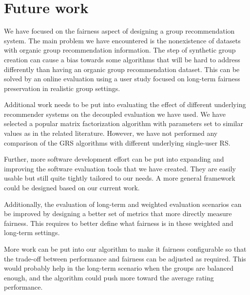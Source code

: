 \section{Future work}  \label{sec:08_conclusion.future_work}

We have focused on the fairness aspect of designing a group recommendation system. The main problem we have encountered is the nonexistence of datasets with organic group recommendation information. The step of synthetic group creation can cause a bias towards some algorithms that will be hard to address differently than having an organic group recommendation dataset. This can be solved by an online evaluation using a user study focused on long-term fairness preservation in realistic group settings.

Additional work needs to be put into evaluating the effect of different underlying recommender systems on the decoupled evaluation we have used. We have selected a popular matrix factorization algorithm with parameters set to similar values as in the related literature. However, we have not performed any comparison of the GRS algorithms with different underlying single-user RS.

Further, more software development effort can be put into expanding and improving the software evaluation tools that we have created. They are easily usable but still quite tightly tailored to our needs. A more general framework could be designed based on our current work.

Additionally, the evaluation of long-term and weighted evaluation scenarios can be improved by designing a better set of metrics that more directly measure fairness. This requires to better define what fairness is in these weighted and long-term settings.

More work can be put into our algorithm to make it fairness configurable so that the trade-off between performance and fairness can be adjusted as required. This would probably help in the long-term scenario when the groups are balanced enough, and the algorithm could push more toward the average rating performance.


